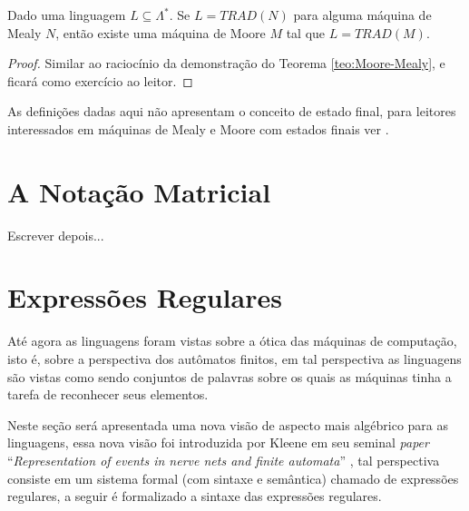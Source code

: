 \begin{theorem}\label{teo:Mealy-Moore}
	Dado uma linguagem $L \subseteq \Lambda^*$. Se $L = TRAD(N)$ para alguma máquina de Mealy $N$,  então existe uma máquina de Moore $M$ tal que $L = TRAD(M)$.
\end{theorem}

\begin{proof}
	Similar ao raciocínio da demonstração do Teorema \ref{teo:Moore-Mealy}, e ficará como exercício ao leitor.
\end{proof}

\begin{remark}
	As definições dadas aqui não apresentam o conceito de estado final, para leitores interessados em máquinas de Mealy e Moore com estados finais ver \cite{menezes1998LFA}.
\end{remark}

\section{A Notação Matricial}\label{sec:NotacaoMatricial}

Escrever depois...

\section{Expressões Regulares}\label{sec:ExpressaoRegulares}

Até agora as linguagens foram vistas sobre a ótica das máquinas de computação, isto é, sobre a perspectiva dos autômatos finitos, em tal perspectiva as linguagens são vistas como sendo conjuntos de palavras sobre os quais as máquinas tinha a tarefa de reconhecer seus elementos. 

Neste seção será apresentada uma nova visão de aspecto mais algébrico para as linguagens, essa nova visão foi introduzida por Kleene em seu seminal \textit{paper} ``\textit{Representation of events in nerve nets and finite automata}'' \cite{kleene1951}, tal perspectiva consiste em um sistema formal (com sintaxe e semântica) chamado de expressões  regulares, a seguir é formalizado a sintaxe das expressões regulares.

